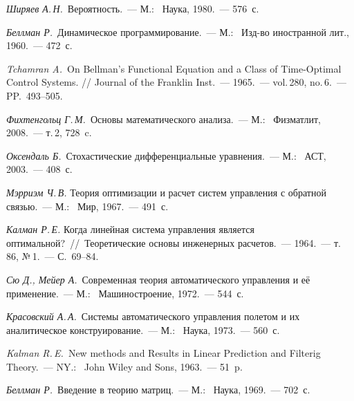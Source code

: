 






\begin{thebibliography}{wlab}


\emph{Ширяев А.\,Н.}~Вероятность.~--- М.:~ Наука, 1980.~--- 576~с.

\emph{Беллман Р.}~Динамическое программирование.~--- М.:~ Изд-во иностранной лит., 1960.~--- 472~с.

\emph{Tchamran A.}~On Bellman's Functional Equation and a Class of Time-Optimal Control Systems. // Journal of the Franklin Inst.~--- 1965.~--- vol.\,280, no.\,6.~--- PP.~493--505.

\emph{Фихтенгольц Г.\,М.}~Основы математического анализа.~--- М.:~ Физматлит, 2008.~--- т.\,2, 728~c.

\emph{Оксендаль Б.}~Стохастические дифференциальные уравнения.~--- М.:~ АСТ, 2003.~--- 408~с.

\emph{Мэрриэм Ч.\,В.} Теория оптимизации и расчет систем управления с обратной связью.~--- М.:~ Мир, 1967.~--- 491~с.

\emph{Калман Р.\,Е.} Когда линейная система управления является оптимальной?~//~Теоретические основы инженерных расчетов.~--- 1964.~--- т.\,86, №\,1.~--- С.~69--84.

\emph{Сю Д., Мейер А.}~Современная теория автоматического управления и её применение.~--- М.:~ Машиностроение, 1972.~--- 544~с.

\emph{Красовский А.\,А.}~Системы автоматического управления полетом и их аналитическое конструирование.~--- М.:~ Наука, 1973.~--- 560~с.

\emph{Kalman R.\,E.}~New methods and Results in Linear Prediction and Filterig Theory.~--- NY.:~ John Wiley and Sons, 1963.~--- 51~p.

\emph{Беллман Р.}~Введение в теорию матриц.~--- М.:~ Наука, 1969.~--- 702~с.


\end{thebibliography}
